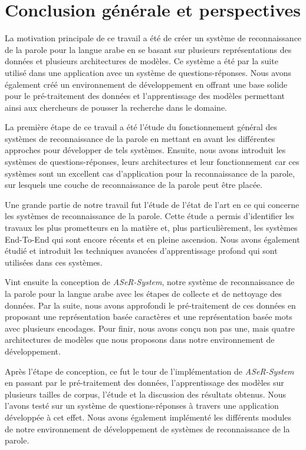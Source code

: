 \chapter*{Conclusion générale et perspectives} %
La motivation principale de ce travail a été de créer un système de reconnaissance de la parole pour la langue arabe en se basant sur plusieurs représentations des données et plusieurs architectures de modèles. Ce système a été par la suite utilisé dans une application avec un système de questions-réponses. Nous avons également créé un environnement de développement en offrant une base solide pour le pré-traitement des données et l'apprentissage des modèles permettant ainsi aux chercheurs de pousser la recherche dans le domaine.

La première étape de ce travail a été l'étude du fonctionnement général des systèmes de reconnaissance de la parole en mettant en avant les différentes approches pour développer de tels systèmes. Ensuite, nous avons introduit les systèmes de questions-réponses, leurs architectures et leur fonctionnement car ces systèmes sont un excellent cas d'application pour la reconnaissance de la parole, \ie sur lesquels une couche de reconnaissance de la parole peut être placée. 

Une grande partie de notre travail fut l'étude de l'état de l'art en ce qui concerne les systèmes de reconnaissance de la parole. Cette étude a permis d'identifier les travaux les plus prometteurs en la matière et, plus particulièrement, les systèmes End-To-End qui sont encore récents et en pleine ascension. Nous avons également étudié et introduit les techniques avancées d'apprentissage profond qui sont utilisées dans ces systèmes. 

Vint ensuite la conception de \textit{ASeR-System}, notre système de reconnaissance de la parole pour la langue arabe avec les étapes de collecte et de nettoyage des données. Par la suite, nous avons approfondi le pré-traitement de ces données en proposant une représentation basée caractères et une représentation basée mots avec plusieurs encodages. Pour finir, nous avons conçu non pas une, mais quatre architectures de modèles que nous proposons dans notre environnement de développement.

Après l'étape de conception, ce fut le tour de l'implémentation de \textit{ASeR-System} en passant par le pré-traitement des données, l'apprentissage des modèles sur plusieurs tailles de corpus, l'étude et la discussion des résultats obtenus. Nous l'avons testé sur un système de questions-réponses à travers une application développée à cet effet. Nous avons également implémenté les différents modules de notre environnement de développement de systèmes de reconnaissance de la parole. 

